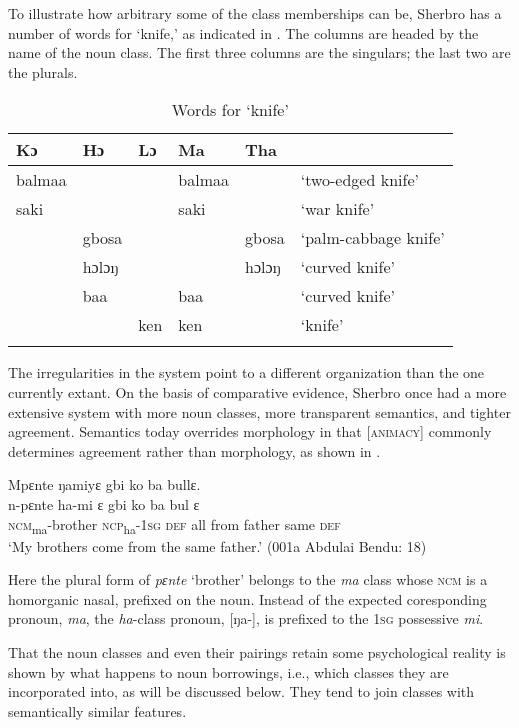 To illustrate how arbitrary some of the class memberships can be, Sherbro has a number of words for ‘knife,' as indicated in . The columns are headed by the name of the noun class. The first three columns are the singulars; the last two are the plurals.

\begin{table}
\caption{\label{tab:nounclass:32}Words for ‘knife'}
\begin{tabularx}{\textwidth}{llllll}
\lsptoprule
Kɔ & Hɔ & Lɔ & Ma & Tha & \\
\midrule
balmaa &  &  & balmaa & & ‘two-edged knife' \\
saki &  &  & saki & & ‘war knife' \\
& gbosa &  &  & gbosa & ‘palm-cabbage knife' \\
& hɔlɔŋ &  &  & hɔlɔŋ & ‘curved knife' \\
& baa &  & baa & & ‘curved knife' \\
&  & ken & ken & & ‘knife' \\
\lspbottomrule
\end{tabularx}
\end{table}

The irregularities in the system point to a different organization than the one currently extant. On the basis of comparative evidence, Sherbro once had a more extensive system with more noun classes, more transparent semantics, and tighter agreement. Semantics today overrides morphology in that [\textsc{animacy}] commonly determines agreement rather than morphology, as shown in .

\newpage
\ea%
    \label{ex:135}
    Mpɛnte ŋamiyɛ gbi ko ba bullɛ.\\
    \gll n-pɛnte      ha-mi      ɛ    gbi  ko    ba      bul  ɛ\\
    \textsc{ncm}\textsubscript{ma}{}-brother  \textsc{ncp}\textsubscript{ha}{}-\textsc{1sg}  \textsc{def}  all    from  father    same  \textsc{def}\\
    \glt ‘My brothers come from the same father.' (001a Abdulai Bendu: 18)
\z

Here the plural form of \textit{pɛnte} ‘brother' belongs to the \textit{ma} class whose \textsc{ncm} is a homorganic nasal, prefixed on the noun. Instead of the expected coresponding pronoun, \textit{ma}, the \textit{ha}{}-class pronoun, [ŋa-], is prefixed to the \textsc{1sg} possessive \textit{mi}.

That the noun classes and even their pairings retain some psychological reality is shown by what happens to noun borrowings, i.e., which classes they are incorporated into, as will be discussed below. They tend to join classes with semantically similar features.

